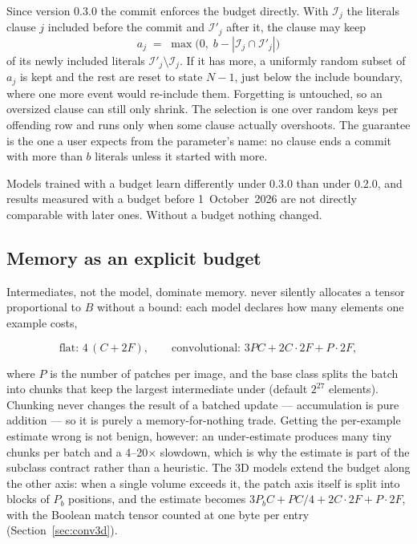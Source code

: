 Since version 0.3.0 the commit enforces the budget directly. With $\mathcal{I}_j$ the
literals clause $j$ included before the commit and $\mathcal{I}'_j$ after it, the clause may
keep
\[
  a_j \;=\; \max\!\big(0,\; b - |\mathcal{I}_j \cap \mathcal{I}'_j|\big)
\]
of its newly included literals $\mathcal{I}'_j \setminus \mathcal{I}_j$. If it has more, a
uniformly random subset of $a_j$ is kept and the rest are reset to state $N-1$, just below
the include boundary, where one more event would re-include them. Forgetting is untouched,
so an oversized clause can still only shrink. The selection is one  over random
keys per offending row and runs only when some clause actually overshoots. The guarantee is
the one a user expects from the parameter's name: no clause ends a commit with more than $b$
literals unless it started with more.

\begin{ttcallout}
Models trained with a budget learn differently under 0.3.0 than under 0.2.0, and results
measured with a budget before 1~October~2026 are not directly comparable with later ones.
Without a budget nothing changed.
\end{ttcallout}

\subsection{Memory as an explicit budget}

Intermediates, not the model, dominate memory. \ttlibname never silently allocates a tensor
proportional to $B$ without a bound: each model declares how many elements one example costs,

\[
  \text{flat: } 4\,(C + 2F),
  \qquad
  \text{convolutional: } 3PC + 2C\cdot 2F + P\cdot 2F ,
\]

where $P$ is the number of patches per image, and the base class splits the batch into chunks
that keep the largest intermediate under  (default $2^{27}$
elements). Chunking never changes the result of a batched update --- accumulation is pure
addition --- so it is purely a memory-for-nothing trade. Getting the per-example estimate
wrong is not benign, however: an under-estimate produces many tiny chunks per batch and a
4--20$\times$ slowdown, which is why the estimate is part of the subclass contract rather
than a heuristic. The 3D models extend the budget along the other axis: when a single volume
exceeds it, the patch axis itself is split into blocks of $P_b$ positions, and the estimate
becomes $3P_bC + PC/4 + 2C\cdot 2F + P\cdot 2F$, with the Boolean match tensor counted at one
byte per entry (Section~\ref{sec:conv3d}).


